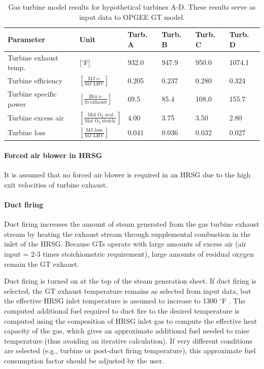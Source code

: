\documentclass[11pt]{report}
\begin{document}
\begin{table}
\caption{Gas turbine model results for hypothetical turbines A-D. These results serve as input data to OPGEE GT model.}
\label{tab:GT_inputs}
\begin{scriptsize}
\begin{tabularx}{1\columnwidth}{p{}p{}p{}p{}p{}p{}}
\toprule
Parameter & Unit & Turb. A & Turb. B & Turb. C & Turb. D \\
\midrule
Turbine exhaust temp. &[$^\circ$F] & 932.0 & 947.9 & 950.0 & 1074.1\\
Turbine efficiency &$\left[\frac{\textrm{MJ e-}}{\textrm{MJ LHV}}\right]$ & 0.205 & 0.237 & 0.280 & 0.324\\ 
Turbine specific power & $\left[\frac{\textrm{Btu e-}}{\textrm{lb exhaust}}\right]$& 69.5 & 85.4 & 108.0 & 155.7\\ 
Turbine excess air & $\left[\frac{\textrm{Mol O$_2$ real}}{\textrm{Mol O$_2$ stoich.}}\right]$& 4.00 & 3.75 & 3.50 & 2.80\\
Turbine loss & $\left[\frac{\textrm{MJ loss}}{\textrm{MJ LHV}}\right]$& 0.041 & 0.036 & 0.032 & 0.027\\ 
\bottomrule
\end{tabularx}
\end{scriptsize}
\end{table}

\paragraph{Forced air blower in HRSG}

It is assumed that no forced air blower is required in an HRSG due to the high exit velocities of turbine exhaust.

\paragraph{Duct firing}

Duct firing increases the amount of steam generated from the gas turbine exhaust stream by heating the exhaust stream through supplemental combustion in the inlet of the HRSG. Because GTs operate with large amounts of excess air (air input = 2-3 times stoichiometric requirement), large amounts of residual oxygen remain the GT exhaust.

Duct firing is turned on at the top of the steam generation sheet.  If duct firing is selected, the GT exhaust temperature remains as selected from input data, but the effective HRSG inlet temperature is assumed to increase to 1300 $^\circ$F \cite[Table 5, Case 2]{Ganapathy1996}.  The computed additional fuel required to duct fire to the desired temperature is computed using the composition of HRSG inlet gas to compute the effective heat capacity of the gas, which gives an approximate additional fuel needed to raise temperature (thus avoiding an iterative calculation).  If very different conditions are selected (e.g., turbine or post-duct firing temperature), this approximate fuel consumption factor should be adjusted by the user.
\end{document}
